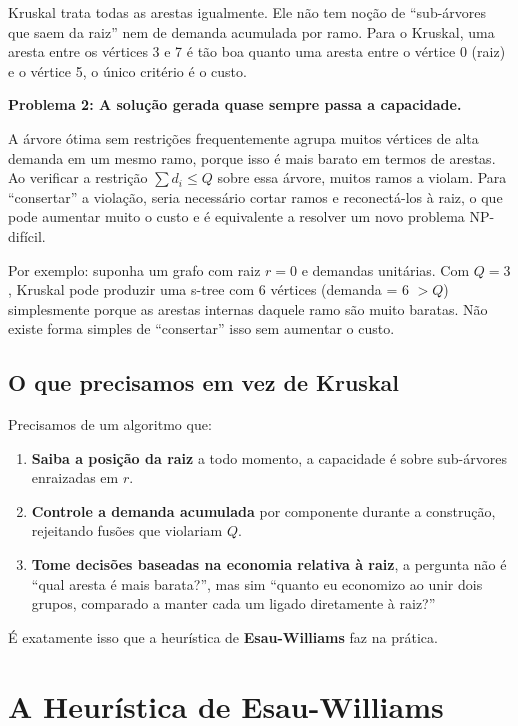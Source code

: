 \documentclass[12pt, a4paper]{article}
\begin{document}
Kruskal trata todas as arestas igualmente. Ele não tem noção de ``sub-árvores que saem da raiz'' nem de demanda acumulada por ramo. Para o Kruskal, uma aresta entre os vértices 3 e 7 é tão boa quanto uma aresta entre o vértice 0 (raiz) e o vértice 5, o único critério é o custo.

\textbf{Problema 2: A solução gerada quase sempre passa a capacidade.}

A árvore ótima sem restrições frequentemente agrupa muitos vértices de alta demanda em um mesmo ramo, porque isso é mais barato em termos de arestas. Ao verificar a restrição $\sum d_i \leq Q$ sobre essa árvore, muitos ramos a violam. Para ``consertar'' a violação, seria necessário cortar ramos e reconectá-los à raiz, o que pode aumentar muito o custo e é equivalente a resolver um novo problema NP-difícil.

\medskip

Por exemplo: suponha um grafo com raiz $r = 0$ e demandas unitárias. Com $Q = 3$, Kruskal pode produzir uma s-tree com 6 vértices (demanda = 6 $> Q$) simplesmente porque as arestas internas daquele ramo são muito baratas. Não existe forma simples de ``consertar'' isso sem aumentar o custo.

\subsection{O que precisamos em vez de Kruskal}

Precisamos de um algoritmo que:

\begin{enumerate}
    \item \textbf{Saiba a posição da raiz} a todo momento, a capacidade é sobre sub-árvores enraizadas em $r$.
    \item \textbf{Controle a demanda acumulada} por componente durante a construção, rejeitando fusões que violariam $Q$.
    \item \textbf{Tome decisões baseadas na economia relativa à raiz},  a pergunta não é ``qual aresta é mais barata?'', mas sim ``quanto eu economizo ao unir dois grupos, comparado a manter cada um ligado diretamente à raiz?''
\end{enumerate}

É exatamente isso que a heurística de \textbf{Esau-Williams} faz na prática.

\section{A Heurística de Esau-Williams}
\end{document}
